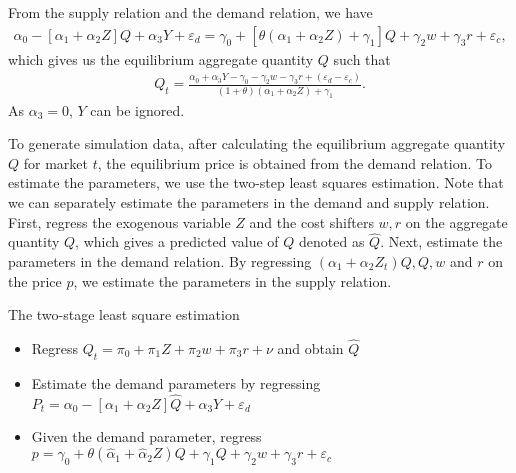 \documentclass[11pt]{article}
\numberwithin{figure}{section}
\theoremstyle{definition}
\newcommand{\0}{\mathbf{0}}
\begin{document}
From the supply relation and the demand relation, we have
\begin{align}
    \alpha_0 - [\alpha_1 + \alpha_2Z] Q + \alpha_3Y + \varepsilon_d = \gamma_0 + [\theta(\alpha_1 + \alpha_2Z)+ \gamma_1] Q   + \gamma_2 w + \gamma_3 r + \varepsilon_c,
\end{align}
which gives us the equilibrium aggregate quantity $Q$ such that 
\begin{align*}
    Q_t =  \frac{\alpha_0 + \alpha_3 Y - \gamma_0 - \gamma_2 w - \gamma_3 r + (\varepsilon_d - \varepsilon_c)}{(1 + \theta) (\alpha_1 + \alpha_2Z) + \gamma_1}.
\end{align*}
As $\alpha_3 = 0$, $Y$ can be ignored.

To generate simulation data, after calculating the equilibrium aggregate quantity $Q$ for market $t$, the equilibrium price is obtained from the demand relation.
To estimate the parameters, we use the two-step least squares estimation. Note that we can separately estimate the parameters in the demand and supply relation. First, regress the exogenous variable $Z$ and the cost shifters $w,r$ on the aggregate quantity $Q$, which gives a predicted value of $Q$ denoted as $\hat{Q}$. Next, estimate the parameters in the demand relation. 
By regressing $(\alpha_1 + \alpha_2 Z_t) Q, Q, w$ and $r$ on the price $p$, we estimate the parameters in the supply relation.

The two-stage least square estimation 
\begin{itemize}
    \item Regress $Q_t = \pi_0 + \pi_1 Z + \pi_2 w + \pi_3 r + \nu$ and obtain $\hat{Q}$
    \item Estimate the demand parameters by regressing $P_t = \alpha_0 - [\alpha_1 + \alpha_2Z] \hat{Q} + \alpha_3Y + \varepsilon_d$
    \item Given the demand parameter, regress $p = \gamma_0 + \theta(\hat{\alpha}_1 + \hat{\alpha}_2Z)Q + \gamma_1Q + \gamma_2 w + \gamma_3 r + \varepsilon_c$
\end{itemize}
\end{document}

